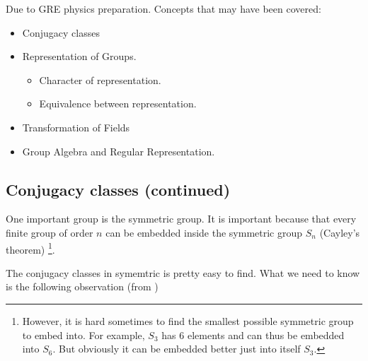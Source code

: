 
Due to GRE physics preparation. Concepts that may have been covered:

\begin{itemize}
    \item Conjugacy classes
    \item Representation of Groups.
        \begin{itemize}
            \item Character of representation.
            \item Equivalence between representation.
        \end{itemize}
    \item Transformation of Fields
    \item Group Algebra and Regular Representation.
\end{itemize}

\subsection{Conjugacy classes (continued)}
\label{sec:Conjugacy classes (continued)}

One important group is the symmetric group. It is important because
that every finite group of order $n$ can be embedded inside the
symmetric group $S_n$ (Cayley's theorem) \footnote{
    However, it is hard sometimes to find the smallest possible
    symmetric group to embed into. For example, $S_3$ has 6 elements
    and can thus be embedded into $S_6$. But obviously it can be
    embedded better just into itself $S_3$.
}.

The conjugacy classes in symemtric is pretty easy to find. What we
need to know is the following observation (from \cite{Ludeling})

